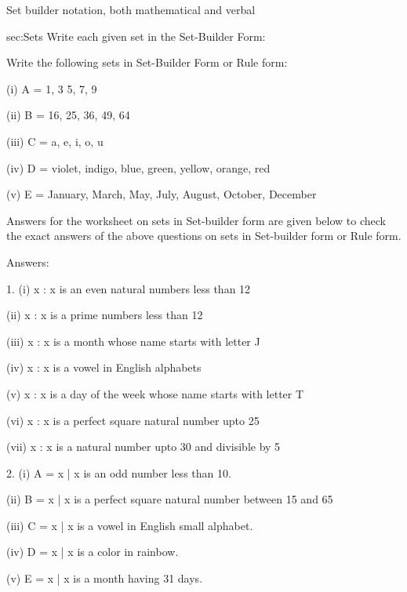 \ExSection[Exercises]
Set builder notation, both mathematical and verbal
\begin{exercises}{sec:Sets}
Write each given set in the Set-Builder Form:



 Write the following sets in Set-Builder Form or Rule form:

(i) A = {1, 3 5, 7, 9}

(ii) B = {16, 25, 36, 49, 64}

(iii) C = {a, e, i, o, u}

(iv) D = {violet, indigo, blue, green, yellow, orange, red}

(v) E = {January, March, May, July, August, October, December}



Answers for the worksheet on sets in Set-builder form are given below to check the exact answers of the above questions on sets in Set-builder form or Rule form.



Answers:



1. (i) {x : x is an even natural numbers less than 12}

(ii) {x : x is a prime numbers less than 12}

(iii) {x : x is a month whose name starts with letter J}

(iv) { x : x is a vowel in English alphabets}

(v) {x : x is a day of the week whose name starts with letter T}

(vi) {x : x is a perfect square natural number upto 25}

(vii) {x : x is a natural number upto 30 and divisible by 5}

 

2. (i) A = {x | x is an odd number less than 10}.

(ii) B = {x | x is a perfect square natural number between 15 and 65}

(iii) C = {x | x is a vowel in English small alphabet}.

(iv) D = {x | x is a color in rainbow}.

(v) E = {x | x is a month having 31 days}.
\end{exercises}



